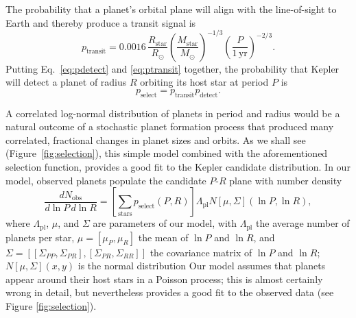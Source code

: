 \documentclass{nature}
\newcommand{\RSun}{R_\odot}
\newcommand{\RStar}{R_\mathrm{star}}
\newcommand{\MStar}{M_\mathrm{star}}
\newcommand{\MSun}{M_\odot}
\newcommand{\Rpl}{\Lambda_\mathrm{pl}}
\begin{document}
The probability that a planet's orbital plane will align with the line-of-sight to
Earth and thereby produce a transit signal is
\begin{equation}
  \label{eq:ptransit}
  p_\mathrm{transit} = 0.0016\, \frac{\RStar}{\RSun}
  \left(\frac{\MStar}{\MSun}\right)^{-1/3} \left(\frac{P}{1\,\mathrm{yr}}\right)^{-2/3}.
\end{equation}
Putting Eq.\ \ref{eq:pdetect} and \ref{eq:ptransit} together, the
probability that Kepler will detect a planet of radius $R$ orbiting
its host star at period $P$ is 
\begin{equation}
  p_\mathrm{select} = p_\mathrm{transit} p_\mathrm{detect}.
\end{equation}

A correlated log-normal distribution of planets in period and radius
would be a natural outcome of a stochastic planet formation process
that produced many correlated, fractional changes in planet sizes and
orbits.  As we shall see (Figure\ \ref{fig:selection}), this simple
model combined with the aforementioned selection function, provides a
good fit to the Kepler candidate distribution.  In our model, observed
planets populate the candidate $P$-$R$ plane with number density
\begin{equation}
  \label{eq:foreground-rate}
  \frac{dN_\mathrm{obs}}{d\ln P\, d\ln R} = \left[ \sum_\mathrm{stars}
    p_\mathrm{select}(P, R) \right] \Rpl N\left[ \mu, \Sigma
    \right]\left( \ln P, \ln R \right),
\end{equation}
where $\Rpl$, $\mu$, and $\Sigma$ are parameters of our model, with
$\Rpl$ the average number of planets per star, $\mu = \left[ \mu_P,
  \mu_R \right]$ the mean of $\ln P$ and $\ln R$, and $\Sigma = \left[
  \left[ \Sigma_{PP}, \Sigma_{PR} \right], \left[ \Sigma_{PR},
    \Sigma_{RR} \right]\right]$ the covariance matrix of $\ln P$ and
$\ln R$; $N\left[ \mu, \Sigma \right](x,y)$ is the normal distribution
Our model assumes that planets appear around their host stars in a
Poisson process; this is almost certainly wrong in
detail\cite{Weissbein2012}, but nevertheless provides a good fit to
the observed data (see Figure \ref{fig:selection}).
\end{document}
